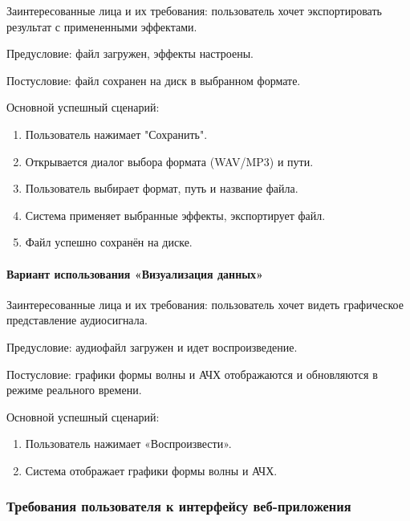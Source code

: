Заинтересованные лица и их требования: пользователь хочет экспортировать результат с примененными эффектами.

Предусловие: файл загружен, эффекты настроены.

Постусловие: файл сохранен на диск в выбранном формате.

Основной успешный сценарий:
\begin{enumerate}
	\item Пользователь нажимает "Сохранить".
	\item Открывается диалог выбора формата (WAV/MP3) и пути.
	\item Пользователь выбирает формат, путь и название файла.
	\item Система применяет выбранные эффекты, экспортирует файл.
	\item Файл успешно сохранён на диске.
\end{enumerate}		

\paragraph{Вариант использования «Визуализация данных»}

Заинтересованные лица и их требования: пользователь хочет видеть графическое представление аудиосигнала.

Предусловие: аудиофайл загружен и идет воспроизведение.

Постусловие: графики формы волны и АЧХ отображаются и обновляются в режиме реального времени.

Основной успешный сценарий:
\begin{enumerate}
	\item Пользователь нажимает «Воспроизвести».
	\item Система отображает графики формы волны и АЧХ.
\end{enumerate}	

\subsubsection{Требования пользователя к интерфейсу веб-приложения}

